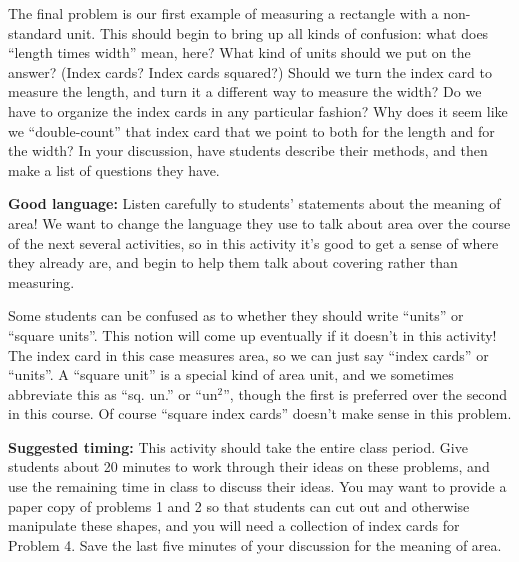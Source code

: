 \documentclass[nooutcomes,noauthor, handout]{ximera}
\begin{document}
\begin{instructorNotes}
The final problem is our first example of measuring a rectangle with a non-standard unit. This should begin to bring up all kinds of confusion: what does ``length times width'' mean, here? What kind of units should we put on the answer? (Index cards? Index cards squared?) Should we turn the index card to measure the length, and turn it a different way to measure the width? Do we have to organize the index cards in any particular fashion? Why does it seem like we ``double-count'' that index card that we point to both for the length and for the width? In your discussion, have students describe their methods, and then make a list of questions they have. 






{\bf Good language:} Listen carefully to students' statements about the meaning of area! We want to change the language they use to talk about area over the course of the next several activities, so in this activity it's good to get a sense of where they already are, and begin to help them talk about covering rather than measuring.

Some students can be confused as to whether they should write ``units'' or ``square units''. This notion will come up eventually if it doesn't in this activity!  The index card in this case measures area, so we can just say ``index cards'' or ``units''.  A ``square unit'' is a special kind of area unit, and we sometimes abbreviate this as ``sq. un.'' or ``un$^2$'', though the first is preferred over the second in this course. Of course ``square index cards'' doesn't make sense in this problem.

{\bf Suggested timing:} This activity should take the entire class period. Give students about 20 minutes to work through their ideas on these problems, and use the remaining time in class to discuss their ideas. You may want to provide a paper copy of problems 1 and 2 so that students can cut out and otherwise manipulate these shapes, and you will need a collection of index cards for Problem 4. Save the last five minutes of your discussion for the meaning of area.



\end{instructorNotes}
\end{document}

